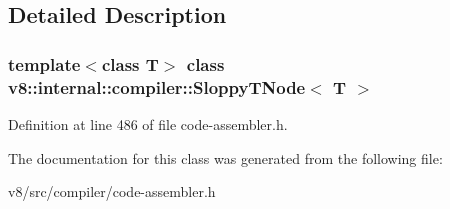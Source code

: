 \subsection{Detailed Description}
\subsubsection*{template$<$class T$>$\newline
class v8\+::internal\+::compiler\+::\+Sloppy\+T\+Node$<$ T $>$}



Definition at line 486 of file code-\/assembler.\+h.



The documentation for this class was generated from the following file\+:\begin{DoxyCompactItemize}
\item 
v8/src/compiler/code-\/assembler.\+h\end{DoxyCompactItemize}
